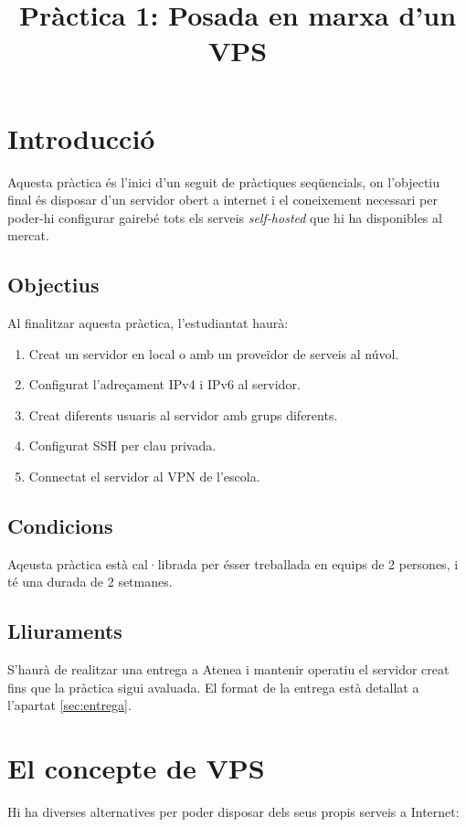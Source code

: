 \documentclass{practicaitic}
\title{Pràctica 1: Posada en marxa d'un VPS}
\begin{document}
\section{Introducció}

Aquesta pràctica és l'inici d'un seguit de pràctiques seqüencials, on
l'objectiu final és disposar d'un servidor obert a internet i el coneixement
necessari per poder-hi configurar gairebé tots els serveis \textit{self-hosted}
que hi ha disponibles al mercat.

\subsection{Objectius}

Al finalitzar aquesta pràctica, l'estudiantat haurà:
\begin{enumerate}
  \item Creat un servidor en local o amb un proveïdor de serveis al núvol.
  \item Configurat l'adreçament IPv4 i IPv6 al servidor.
  \item Creat diferents usuaris al servidor amb grups diferents.
  \item Configurat SSH per clau privada.
  \item Connectat el servidor al VPN de l'escola.
\end{enumerate}

\subsection{Condicions}

Aqeusta pràctica està cal·librada per ésser treballada en equips de 2 persones,
i té una durada de 2 setmanes.

\subsection{Lliuraments}

S'haurà de realitzar una entrega a Atenea i mantenir operatiu el servidor creat
fins que la pràctica sigui avaluada. El format de la entrega està detallat a
l'apartat \ref{sec:entrega}.

\section{El concepte de VPS}

Hi ha diverses alternatives per poder disposar dels seus propis serveis a
Internet:
\end{document}
